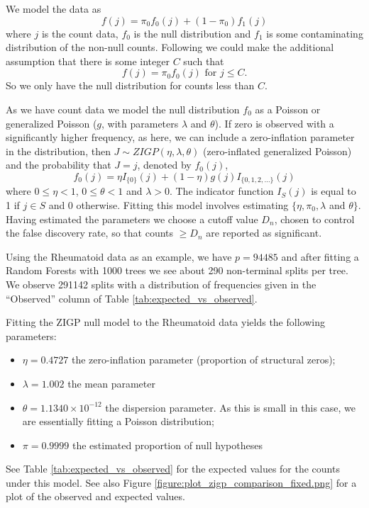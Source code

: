 \documentclass[preprint,12pt,3p]{elsarticle}
\begin{document}
We model the data as 
\[
f (j ) = \pi_0 f_0 (j ) + (1 - \pi_0 )f_1 (j )
\]
where $j$ is the count data, $f_0$ is the null distribution and $f_1$ is some contaminating distribution of the
non-null counts. Following \cite{Gauran.et.al.2018} we could make the additional assumption that there is some integer $C$ such that
\begin{equation}
  f(j ) = \pi_0 f_0 (j ) \textrm{ for } j \leq C.
\label{eqn:C}  
\end{equation}
So we only have the null distribution for counts less than $C.$ 

As we have count data we model the null distribution $f_0$ as a Poisson or  generalized Poisson ($g$, with parameters
$\lambda$ and $\theta$).
If zero is observed with a significantly higher frequency, as here, we can include a zero-inflation parameter in the
distribution, then $J \sim ZIGP(\eta, \lambda, \theta)$ (zero-inflated generalized Poisson) and the probability that $J = j$, denoted by $f_0 (j)$, 
\[
  f_0(j) = \eta I_{\{0\}} (j) + (1 - \eta) g(j) I_{\{0,1,2,\ldots \}} (j)
\]
where $0 \leq \eta < 1$, $0 \leq \theta < 1$ and $\lambda > 0$. The indicator function
$I_S (j)$ is equal to 1 if $j \in  S$ and 0 otherwise. Fitting this model involves estimating $\{ \eta, \pi_0,
\lambda$ and $\theta \}$. Having estimated the parameters we choose a cutoff value $D_n$, chosen to control the false
discovery rate, so that counts $\geq  D_n$ are reported as significant.

Using the Rheumatoid data as an example, we have $p= 94485$ and after fitting a Random Forests with
1000 trees we see about 290 non-terminal splits per tree. We observe 291142 splits with a distribution of frequencies
given in the ``Observed'' column of Table \ref{tab:expected_vs_observed}.


Fitting the ZIGP null model to the Rheumatoid data yields the following parameters:
\begin{itemize}
\item $\eta= 0.4727$    the zero-inflation parameter (proportion of structural zeros);
\item $\lambda= 1.002$   the mean parameter
\item $\theta= 1.1340\times 10^{-12}$   the dispersion parameter. As this is small in this case, we are essentially
  fitting a Poisson distribution;
\item $\pi= 0.9999$  the estimated proportion of null hypotheses
\end{itemize}

See Table \ref{tab:expected_vs_observed} for the expected values for the counts under this model. See also Figure
\ref{figure:plot_zigp_comparison_fixed.png} for a plot of the observed and expected values.
\end{document}
